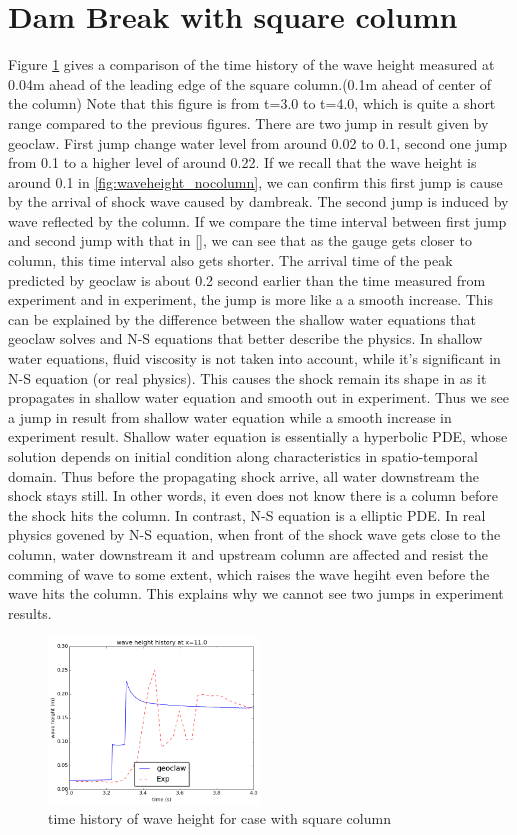 \documentclass[11pt]{article}
\begin{document}
\section{Dam Break with square column}\label{Sec:Square}
Figure \ref{fig:waveheight_square_x=11.0} gives a comparison of the time history of the wave height measured at 0.04m ahead of the leading edge of the square column.(0.1m ahead of center of the column)
Note that this figure is from t=3.0 to t=4.0, which is quite a short range compared to the previous figures.
There are two jump in result given by geoclaw. First jump change water level from around 0.02 to 0.1, second one jump from 0.1 to a higher level of around 0.22.
If we recall that the wave height is around 0.1 in \ref{fig:waveheight_nocolumn}, we can confirm this first jump is cause by the arrival of shock wave caused by dambreak. The second jump is induced by wave reflected by the column.  
If we compare the time interval between first jump and second jump with that in \ref{}, we can see that as the gauge gets closer to column, this time interval also gets shorter.
%
The arrival time of the peak predicted by geoclaw is about 0.2 second earlier than the time measured from experiment and in experiment, the jump is more like a a smooth increase. 
This can be explained by the difference between the shallow water equations that geoclaw solves and N-S equations that better describe the physics.
In shallow water equations, fluid viscosity is not taken into account, while it's significant in N-S equation (or real physics).
This causes the shock remain its shape in as it propagates in shallow water equation and smooth out in experiment.
Thus we see a jump in result from shallow water equation while a smooth increase in experiment result.
Shallow water equation is essentially a hyperbolic PDE, whose solution depends on initial condition along characteristics in spatio-temporal domain. 
Thus before the propagating shock arrive, all water downstream the shock stays still. In other words, it even does not know there is a column before the shock hits the column. In contrast, N-S equation is a elliptic PDE. 
In real physics govened by N-S equation, when front of the shock wave gets close to the column, water downstream it and upstream column are affected and resist the comming of wave to some extent, which raises the wave hegiht even before the wave hits the column.   
This explains why we cannot see two jumps in experiment results.
\begin{figure}[h!]
    \centering
    \includegraphics[width=0.5\textwidth]{./plots/waveheight_square_x11}
    \caption{time history of wave height for case with square column}
    \label{fig:waveheight_square_x=11.0}
\end{figure}
\end{document}
